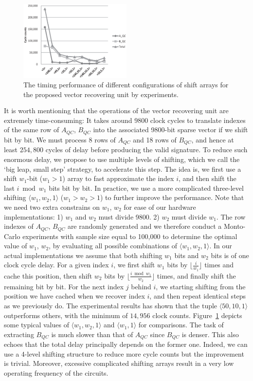 \documentclass[10pt,journal,compsoc]{IEEEtran}
\begin{document}
\begin{figure}[!htb]\centering
	\includegraphics[width=0.5\textwidth]{./fig/blss.eps}
	\caption{The timing performance of different configurations of shift arrays for the proposed vector recovering unit by experiments.}\label{fig:blss}
\end{figure}

It is worth mentioning that the operations of the vector recovering unit are extremely time-consuming: It takes around 9800 clock cycles to translate  indexes of the same row of $A_{QC}$, $B_{QC}$ into the associated 9800-bit sparse vector if we shift bit by bit. We must process 8 rows of $A_{QC}$ and 18 rows of $B_{QC}$,  and hence at least $254,800$ cycles of delay before producing the valid signature. To reduce such enormous delay, we propose to use multiple levels of shifting, which we call  the  `big leap, small step' strategy, to accelerate this step.  The idea is, we first use a  shift $w_1$-bit ($w_1>1$) array to fast approximate the index $i$, and then shift the last $i\bmod w_1$ bits bit by bit. In practice, we use a more complicated three-level shifting $\langle w_1,w_2,1\rangle$ ($w_1>w_2>1$) to further improve the performance. Note that we need two extra constrains on $w_1$, $w_2$ for ease of our hardware implementations: 1) $w_1$ and $w_2$ must divide 9800. 2) $w_2$ must divide $w_1$. The row indexes of $A_{QC}$, $B_{QC}$ are randomly generated and we therefore conduct a Monto-Carlo experiments with sample size equal to 100,000 to determine the optimal value of $w_1$, $w_2$, by evaluating all possible combinations of $\langle w_1,w_2,1\rangle$. In our actual implementations we assume that both shifting $w_1$ bits and  $w_2$ bits is of one clock cycle delay. For a given index $i$, we first shift $w_1$ bits by $\lfloor\frac{i}{w_1}\rfloor$ times and cache this position, then shift $w_2$ bits by $\lfloor\frac{i\bmod w_1}{w_2}\rfloor$ times, and finally shift the remaining bit by bit. For the next index $j$ behind $i$, we starting shifting from the position we have cached when we recover index $i$, and then repeat identical steps as we previously do. The experimental results has shown that the tuple $\langle 50,10,1\rangle$ outperforms others, with the minimum of $14,956$ clock counts.  Figure~\ref{fig:blss} depicts some typical values of $\langle w_1,w_2,1\rangle$ and $\langle w_1,1\rangle$ for comparisons. The task of extracting $B_{QC}$ is much slower than that of $A_{QC}$ since $B_{QC}$ is denser. This also echoes that the total delay principally depends on the former one.  Indeed, we can use a 4-level shifting structure to reduce more cycle counts but the improvement is trivial. Moreover,  excessive complicated shifting arrays result in a very low operating frequency of the circuits.
\end{document}

